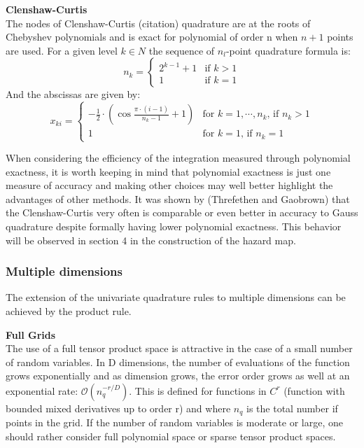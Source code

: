 \documentclass{article}
\begin{document}
\textbf{Clenshaw-Curtis}\\
The nodes of Clenshaw-Curtis (citation) quadrature are at the roots of Chebyshev polynomials and
is exact for polynomial of order n when $n+1$ points are used.
For a given level $k \in N$ the sequence of $n_l$-point quadrature formula is:
\begin{equation}
n_k= \left \{ \begin{array}{ll}
                    2^{k-1} + 1 & \mbox{if $k>1$}\\
                    1 &\mbox{if $k=1$}
              \end{array}
              \right.
\end{equation}
And the abscissas are given by:
\begin{equation}
x_{ki}= \left \{ \begin{array}{ll}
                   -\frac{1}{2}\cdot(\cos\frac{\pi \cdot (i-1)}{n_k-1}+1) & \mbox{for $k=1,\cdots,n_k$, if $n_k >1$}\\
                    1 &\mbox{for $k=1$, if $n_k=1$}
              \end{array}
              \right.
\end{equation}

When considering the efficiency of the integration measured through polynomial exactness, it is
worth keeping in mind that polynomial exactness is just one measure of accuracy and making
other choices may well better highlight the advantages of other methods. It was shown by (Threfethen 
and Gaobrown) that the Clenshaw-Curtis very often is comparable or even better in accuracy to Gauss
quadrature despite formally having lower polynomial exactness. This behavior will be observed 
in section 4 in the construction of the hazard map.

\subsubsection{Multiple dimensions}
The extension of the univariate quadrature rules to multiple dimensions can be achieved by 
the product rule. 

\textbf{Full Grids}\\
 The use of a full tensor product space is attractive in the case of a small number of random variables.
 In D dimensions, the number of evaluations of the function grows exponentially and as dimension
 grows, the error order grows as well at an exponential rate: $\mathcal{O}(n_{q}^{-r/D})$.
 This is defined for functions in $C^r$ (function with bounded mixed derivatives up to order r)
 and where $n_q$ is the total number if points in the grid.
 If the number of random variables is moderate or large, one should rather consider full polynomial 
 space or sparse tensor product spaces. 
\end{document}

